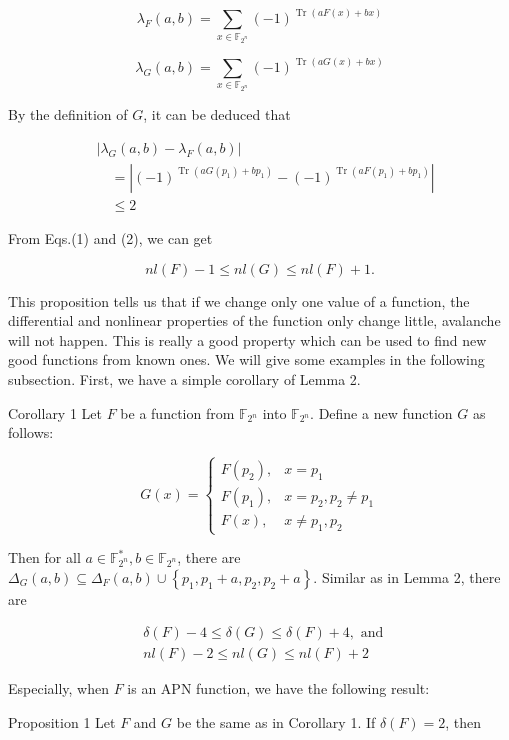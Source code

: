 \documentclass[10pt]{article}
\begin{document}
$$
\lambda_{F}(a, b)=\sum_{x \in \mathbb{F}_{2^{n}}}(-1)^{\operatorname{Tr}(a F(x)+b x)}
$$

$$
\lambda_{G}(a, b)=\sum_{x \in \mathbb{F}_{2^{n}}}(-1)^{\operatorname{Tr}(a G(x)+b x)}
$$

By the definition of $G$, it can be deduced that


\begin{align*}
& \left|\lambda_{G}(a, b)-\lambda_{F}(a, b)\right| \\
& \quad=\left|(-1)^{\operatorname{Tr}\left(a G\left(p_{1}\right)+b p_{1}\right)}-(-1)^{\operatorname{Tr}\left(a F\left(p_{1}\right)+b p_{1}\right)}\right| \\
& \quad \leq 2 \tag{2}
\end{align*}


From Eqs.(1) and (2), we can get

$$
n l(F)-1 \leq n l(G) \leq n l(F)+1 .
$$

This proposition tells us that if we change only one value of a function, the differential and nonlinear properties of the function only change little, avalanche will not happen. This is really a good property which can be used to find new good functions from known ones. We will give some examples in the following subsection. First, we have a simple corollary of Lemma 2.

Corollary 1 Let $F$ be a function from $\mathbb{F}_{2^{n}}$ into $\mathbb{F}_{2^{n}}$. Define a new function $G$ as follows:

$$
G(x)= \begin{cases}F\left(p_{2}\right), & x=p_{1} \\ F\left(p_{1}\right), & x=p_{2}, p_{2} \neq p_{1} \\ F(x), & x \neq p_{1}, p_{2}\end{cases}
$$

Then for all $a \in \mathbb{F}_{2^{n}}^{*}, b \in \mathbb{F}_{2^{n}}$, there are $\Delta_{G}(a, b) \subseteq \Delta_{F}(a, b) \cup \left\{p_{1}, p_{1}+a, p_{2}, p_{2}+a\right\}$. Similar as in Lemma 2, there are

$$
\begin{aligned}
& \delta(F)-4 \leq \delta(G) \leq \delta(F)+4, \text { and } \\
& n l(F)-2 \leq n l(G) \leq n l(F)+2
\end{aligned}
$$

Especially, when $F$ is an APN function, we have the following result:

Proposition 1 Let $F$ and $G$ be the same as in Corollary 1. If $\delta(F)=2$, then
\end{document}
